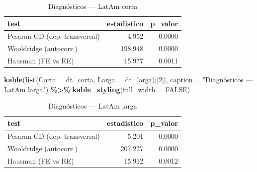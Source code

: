 \documentclass[
]{article}
\newenvironment{Shaded}{\begin{snugshade}}{\end{snugshade}}
\newcommand{\AttributeTok}[1]{\textcolor[rgb]{0.13,0.29,0.53}{#1}}
\newcommand{\ConstantTok}[1]{\textcolor[rgb]{0.56,0.35,0.01}{#1}}
\newcommand{\DecValTok}[1]{\textcolor[rgb]{0.00,0.00,0.81}{#1}}
\newcommand{\FunctionTok}[1]{\textcolor[rgb]{0.13,0.29,0.53}{\textbf{#1}}}
\newcommand{\NormalTok}[1]{#1}
\newcommand{\SpecialCharTok}[1]{\textcolor[rgb]{0.81,0.36,0.00}{\textbf{#1}}}
\newcommand{\StringTok}[1]{\textcolor[rgb]{0.31,0.60,0.02}{#1}}
\begin{document}
\begin{longtable}[t]{lrr}
\caption{\label{tab:diagnostics-fn}Diagnósticos — LatAm corta}\\
\toprule
test & estadistico & p\_valor\\
\midrule
Pesaran CD (dep. transversal) & -4.952 & 0.0000\\
Wooldridge (autocorr.) & 198.948 & 0.0000\\
Hausman (FE vs RE) & 15.977 & 0.0011\\
\bottomrule
\end{longtable}

\begin{Shaded}
\begin{Highlighting}[]
\FunctionTok{kable}\NormalTok{(}\FunctionTok{list}\NormalTok{(}\AttributeTok{Corta =}\NormalTok{ dt\_corta, }\AttributeTok{Larga =}\NormalTok{ dt\_larga)[[}\DecValTok{2}\NormalTok{]], }\AttributeTok{caption =} \StringTok{"Diagnósticos — LatAm larga"}\NormalTok{) }\SpecialCharTok{\%\textgreater{}\%} \FunctionTok{kable\_styling}\NormalTok{(}\AttributeTok{full\_width =} \ConstantTok{FALSE}\NormalTok{)}
\end{Highlighting}
\end{Shaded}

\begin{longtable}[t]{lrr}
\caption{\label{tab:diagnostics-fn}Diagnósticos — LatAm larga}\\
\toprule
test & estadistico & p\_valor\\
\midrule
Pesaran CD (dep. transversal) & -5.201 & 0.0000\\
Wooldridge (autocorr.) & 207.227 & 0.0000\\
Hausman (FE vs RE) & 15.912 & 0.0012\\
\bottomrule
\end{longtable}
\end{document}
